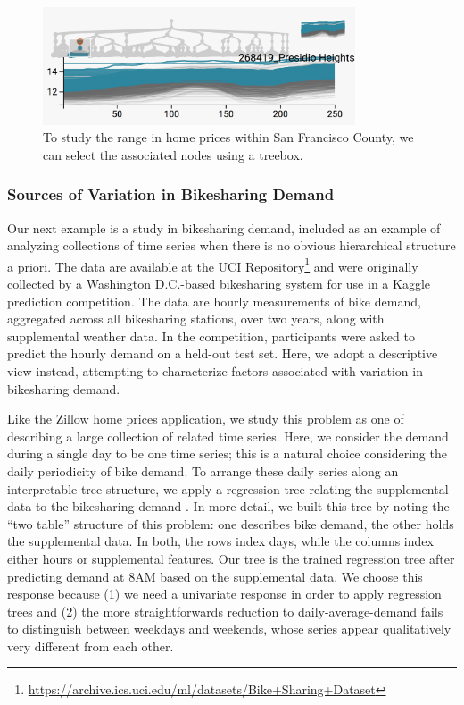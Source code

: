 \documentclass[12pt]{article}
\begin{document}
\begin{figure}

{\centering \includegraphics[width=350px]{figure/zillow_sf} 

}

\caption{To study the range in home prices within San Francisco County, we can select the associated nodes using a treebox.}\label{fig:zillowsf}
\end{figure}

\subsubsection*{Sources of Variation in Bikesharing
Demand}\label{bikesharing-study}

Our next example is a study in bikesharing demand, included as an
example of analyzing collections of time series when there is no obvious
hierarchical structure a priori. The data are available at the UCI
Repository\footnote{\url{https://archive.ics.uci.edu/ml/datasets/Bike+Sharing+Dataset}}
and were originally collected by a Washington D.C.-based bikesharing
system for use in a Kaggle prediction competition. The data are hourly
measurements of bike demand, aggregated across all bikesharing stations,
over two years, along with supplemental weather data. In the
competition, participants were asked to predict the hourly demand on a
held-out test set. Here, we adopt a descriptive view instead, attempting
to characterize factors associated with variation in bikesharing demand.

Like the Zillow home prices application, we study this problem as one of
describing a large collection of related time series. Here, we consider
the demand during a single day to be one time series; this is a natural
choice considering the daily periodicity of bike demand. To arrange
these daily series along an interpretable tree structure, we apply a
regression tree relating the supplemental data to the bikesharing demand
\citep{breiman1984classification}. In more
detail, we built this tree by noting the ``two table'' structure of this
problem: one describes bike demand, the other holds the supplemental
data. In both, the rows index days, while the columns index either hours
or supplemental features. Our tree is the trained regression tree after
predicting demand at 8AM based on the supplemental data. We choose this
response because (1) we need a univariate response in order to apply
regression trees and (2) the more straightforwards reduction to
daily-average-demand fails to distinguish between weekdays and weekends,
whose series appear qualitatively very different from each other.
\end{document}
